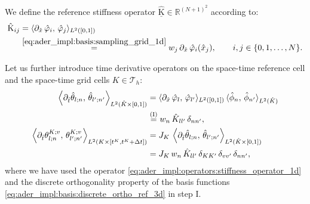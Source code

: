 \documentclass{scrreprt}
\theoremstyle{definition}
\theoremstyle{nonumberplain}
\newcommand{\laMat}[1]{\underline{\mathrm{#1}}}
\newcommand{\laMatel}[1]{\mathrm{#1}}
\newcommand{\tria}{\mathcal{T}_h}
\newcommand{\cell}{K}
\newcommand{\refCell}{\hat{\cell}}
\newcommand{\detJ}{J_\cell}
\begin{document}
We define the reference stiffness operator
$\laMat{\hat{K}}\in\mathbb{R}^{(N+1)^2}$ according to:
\begin{align}
\label{eq:ader_impl:operators:stiffness_operator_1d}
\laMatel{\hat{K}}_{ij} &=
\langle
\partial_{\hat{x}}\,\hat{\varphi}_{i},\,\hat{\varphi}_{j}\rangle_{L^2([0,1])}
\notag\\
&
\overset{\eqref{eq:ader_impl:basis:sampling_grid_1d}}
=
w_{j}\,
\partial_{\hat{x}}\,\hat{\varphi}_{i}(\hat{x}_{j}),\qquad
i,j\in\{0,1,\ldots,N\}.
\end{align}

Let us further introduce time derivative operators on the space-time reference
cell and the space-time grid cells $\cell\in\tria$:
\begin{align}
\label{eq:ader_impl:operators:stiffness_operator_time_ref}
\left\langle
\partial_{\hat{t}}\hat{\theta}_{l;n},\,
\hat{\theta}_{l';n'}
\right\rangle
_{L^2(\refCell\times[0,1])}
&=
\langle
\partial_{\hat{x}}\,\hat{\varphi}_{l},\,\hat{\varphi}_{l'}\rangle_{L^2([0,1])}
\,
\langle \hat{\phi}_{n},\,\hat{\phi}_{n'}\rangle_{L^2(\refCell)}\notag
\\
&\overset{\textup{(I)}}{=}
w_{n}\,\hat{K}_{ll'}\,\delta_{n n'},
\\
\label{eq:ader_impl:operators:stiffness_operator_time_grid}
\left\langle
\partial_{\hat{t}}\theta^{\cell;v}_{l;n},\,
\theta^{\cell;v}_{l';n'}
\right\rangle
_{L^2(\cell\times[t^\cell,t^\cell+\Delta t])}
&=
\detJ\,
\left\langle
\partial_{\hat{t}}\hat{\theta}_{l;n},\,
\hat{\theta}_{l';n'}
\right\rangle
_{L^2(\refCell\times[0,1])}
\notag
\\
&=
\detJ\,
w_{n}\,
\hat{K}_{ll'}\,
\delta_{\cell\cell'}\,\delta_{vv'}\,
\delta_{n n'},
\end{align}
where we have used the operator
\eqref{eq:ader_impl:operators:stiffness_operator_1d} and
the discrete orthogonality property of the basis functions
\eqref{eq:ader_impl:basis:discrete_ortho_ref_3d} in step I.
\end{document}
